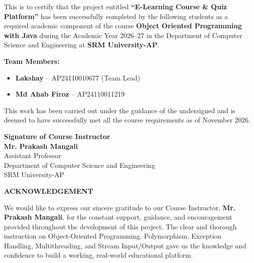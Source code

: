 \documentclass[12pt,a4paper]{article}
\begin{document}
\noindent This is to certify that the project entitled \textbf{“E-Learning Course \& Quiz Platform”} has been successfully completed by the following students as a required academic component of the course \textbf{Object Oriented Programming with Java} during the Academic Year 2026--27 in the Department of Computer Science and Engineering at \textbf{SRM University-AP}.

\vspace{1cm}
\noindent \textbf{Team Members:}
\begin{itemize}
    \item \textbf{Lakshay} -- AP24110010677 (Team Lead)
    \item \textbf{Md Ahab Firoz} -- AP24110011219
\end{itemize}

\vspace{1.5cm}
\noindent This work has been carried out under the guidance of the undersigned and is deemed to have successfully met all the course requirements as of November 2026.

\vspace{3.5cm}
\begin{flushright}
    \textbf{Signature of Course Instructor}\\[0.2cm]
    \textbf{Mr. Prakash Mangali}\\[0.1cm]
    Assistant Professor\\
    Department of Computer Science and Engineering\\
    SRM University-AP
\end{flushright}

\newpage

\begin{center}
    {\huge \textbf{ACKNOWLEDGEMENT}}\\[1.5cm]
\end{center}

\noindent We would like to express our sincere gratitude to our Course Instructor, \textbf{Mr. Prakash Mangali}, for the constant support, guidance, and encouragement provided throughout the development of this project. The clear and thorough instruction on Object-Oriented Programming, Polymorphism, Exception Handling, Multithreading, and Stream Input/Output gave us the knowledge and confidence to build a working, real-world educational platform.
\end{document}
